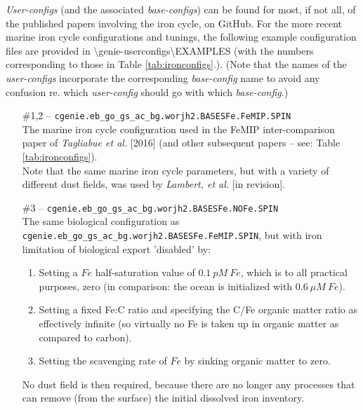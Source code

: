 \documentclass[11pt,fleqn]{book} %
\begin{document}
\textit{User-configs} (and the associated \textit{base-configs}) can be found for most, if not all, of the published papers involving the iron cycle, on GitHub. For the more recent marine iron cycle configurations and tunings, the following example configuration files are provided in \textsf{\footnotesize \textbackslash genie-userconfigs\textbackslash  EXAMPLES} (with the numbers corresponding to those in Table \ref{tab:ironconfigs}.). (Note that the names of the \textit{user-configs} incorporate the corresponding \textit{base-config} name to avoid any confusion re. which \textit{user-config} should go with which \textit{base-config}.)
\vspace{1mm}
\begin{itemize}[noitemsep]
\vspace{1mm}
\item [\#1,2] -- \texttt{cgenie.eb\_go\_gs\_ac\_bg.worjh2.BASESFe.FeMIP.SPIN}
\vspace{1mm}
\\The marine iron cycle configuration used in the FeMIP inter-comparison paper of \textit{Tagliabue et al.} [2016] (and other subsequent papers -- see: Table \ref{tab:ironconfigs}).
\\Note that the same marine iron cycle parameters, but with a variety of different dust fields, was used by \textit{Lambert, et al.} [in revision].
\vspace{1mm}
\item [\#3] -- \texttt{cgenie.eb\_go\_gs\_ac\_bg.worjh2.BASESFe.NOFe.SPIN}
\vspace{1mm}
\\The same biological configuration as \texttt{\small cgenie.eb\_go\_gs\_ac\_bg.worjh2.BASESFe.FeMIP.SPIN}, but with iron limitation of biological export 'disabled' by:
\begin{enumerate}[noitemsep]
\item Setting a \(Fe\) half-saturation value of \(0.1\:pM\:Fe\), which is to all practical purposes, zero (in comparison: the ocean is initialized with \(0.6\:\mu M\:Fe\)).
\item Setting a fixed Fe:C ratio and specifying the C/Fe organic matter ratio as effectively infinite (so virtually no Fe is taken up in organic matter as compared to carbon).
\item Setting the scavenging rate of \(Fe\) by sinking organic matter to zero.
\end{enumerate}
No dust field is then required, because there are no longer any processes that can remove (from the surface) the initial dissolved iron inventory.

\end{itemize}
\end{document}
